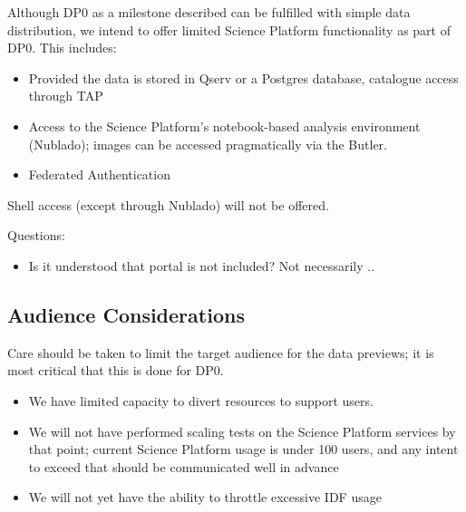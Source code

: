 Although DP0 as a milestone described  can be fulfilled with simple data distribution, we intend to offer limited Science Platform functionality as part of DP0. This includes:

\begin{itemize}

\item Provided the data is stored in Qserv or a Postgres database, catalogue access through TAP

\item Access to the Science Platform's notebook-based analysis environment (Nublado); images can be accessed pragmatically via the Butler.

\item Federated Authentication

\end{itemize}

Shell access (except through Nublado) will not be offered.

Questions:

\begin{itemize}

\item Is it understood that portal is not included? Not necessarily ..

\end{itemize}


\subsection{Audience Considerations}

Care should be taken to limit the target audience for the data previews; it is most critical that this is done for DP0.

\begin{itemize}

\item We have limited capacity to divert resources to support users.

\item We will not have performed scaling tests on the Science Platform services by that point; current Science Platform usage is under 100 users, and any intent to exceed that should be communicated well in advance

\item We will not yet have the ability to throttle excessive IDF usage

\end{itemize}

